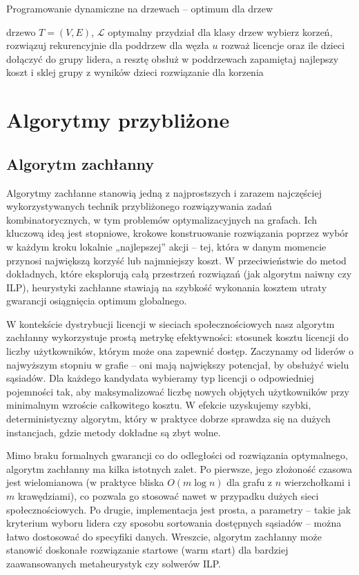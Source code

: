 \begin{algorithm}[H]
\caption{Programowanie dynamiczne na drzewach – optimum dla drzew}
\label{alg:treedp}
\begin{algorithmic}[1]
\Require drzewo $T=(V,E)$, $\mathcal{L}$
\Ensure optymalny przydział dla klasy drzew
\State wybierz korzeń, rozwiązuj rekurencyjnie dla poddrzew
\State dla węzła $u$ rozważ licencje oraz ile dzieci dołączyć do grupy lidera, a resztę obsłuż w poddrzewach
\State zapamiętaj najlepszy koszt i sklej grupy z wyników dzieci
\State \Return rozwiązanie dla korzenia
\end{algorithmic}
\end{algorithm}

\section{Algorytmy przybliżone}

\subsection{Algorytm zachłanny}

Algorytmy zachłanne stanowią jedną z najprostszych i zarazem najczęściej wykorzystywanych technik przybliżonego rozwiązywania zadań kombinatorycznych, w tym problemów optymalizacyjnych na grafach. Ich kluczową ideą jest stopniowe, krokowe konstruowanie rozwiązania poprzez wybór w każdym kroku lokalnie „najlepszej” akcji – tej, która w danym momencie przynosi największą korzyść lub najmniejszy koszt. W przeciwieństwie do metod dokładnych, które eksplorują całą przestrzeń rozwiązań (jak algorytm naiwny czy ILP), heurystyki zachłanne stawiają na szybkość wykonania kosztem utraty gwarancji osiągnięcia optimum globalnego.

W kontekście dystrybucji licencji w sieciach społecznościowych nasz algorytm zachłanny wykorzystuje prostą metrykę efektywności: stosunek kosztu licencji do liczby użytkowników, którym może ona zapewnić dostęp. Zaczynamy od liderów o najwyższym stopniu w grafie – oni mają największy potencjał, by obsłużyć wielu sąsiadów. Dla każdego kandydata wybieramy typ licencji o odpowiedniej pojemności tak, aby maksymalizować liczbę nowych objętych użytkowników przy minimalnym wzroście całkowitego kosztu. W efekcie uzyskujemy szybki, deterministyczny algorytm, który w praktyce dobrze sprawdza się na dużych instancjach, gdzie metody dokładne są zbyt wolne.

Mimo braku formalnych gwarancji co do odległości od rozwiązania optymalnego, algorytm zachłanny ma kilka istotnych zalet. Po pierwsze, jego złożoność czasowa jest wielomianowa (w praktyce bliska $O(m\log n)$ dla grafu z $n$ wierzchołkami i $m$ krawędziami), co pozwala go stosować nawet w przypadku dużych sieci społecznościowych. Po drugie, implementacja jest prosta, a parametry – takie jak kryterium wyboru lidera czy sposobu sortowania dostępnych sąsiadów – można łatwo dostosować do specyfiki danych. Wreszcie, algorytm zachłanny może stanowić doskonałe rozwiązanie startowe (warm start) dla bardziej zaawansowanych metaheurystyk czy solwerów ILP.

